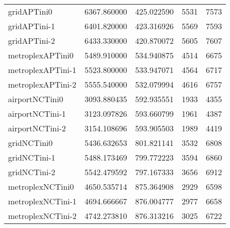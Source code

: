 \begin{table}[h]
\begin{longtable}{lrrrr}
gridAPTini0 & 6367.860000 & 425.022590 & 5531 & 7573 \\
gridAPTini-1 & 6401.820000 & 423.316926 & 5569 & 7593 \\
gridAPTini-2 & 6433.330000 & 420.870072 & 5605 & 7607 \\
metroplexAPTini0 & 5489.910000 & 534.940875 & 4514 & 6675 \\
metroplexAPTini-1 & 5523.800000 & 533.947071 & 4564 & 6717 \\
metroplexAPTini-2 & 5555.540000 & 532.079994 & 4616 & 6757 \\
airportNCTini0 & 3093.880435 & 592.935551 & 1933 & 4355 \\
airportNCTini-1 & 3123.097826 & 593.660799 & 1961 & 4387 \\
airportNCTini-2 & 3154.108696 & 593.905503 & 1989 & 4419 \\
gridNCTini0 & 5436.632653 & 801.821141 & 3532 & 6808 \\
gridNCTini-1 & 5488.173469 & 799.772223 & 3594 & 6860 \\
gridNCTini-2 & 5542.479592 & 797.167333 & 3656 & 6912 \\
metroplexNCTini0 & 4650.535714 & 875.364908 & 2929 & 6598 \\
metroplexNCTini-1 & 4694.666667 & 876.004777 & 2977 & 6658 \\
metroplexNCTini-2 & 4742.273810 & 876.313216 & 3025 & 6722 \\
\end{longtable}
\end{table}

